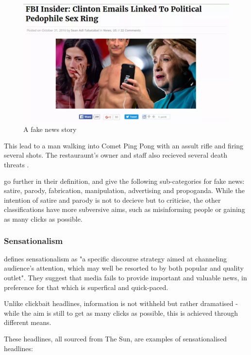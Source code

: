 \begin{figure}[h!]
  \includegraphics[width=\linewidth]{images/fakenews.png}
  \caption{A fake news story}
  \label{fig:fakenews}
\end{figure}


This lead to a man walking into Comet Ping Pong with an assult rifle and firing several shots. The restauraunt's owner and staff also recieved several death threats \cite{lopez2016}. 

\citeauthor{allcott2017} go further in their definition, and give the following sub-categories for fake news: satire, parody, fabrication, manipulation, advertising and propoganda. While the intention of satire and parody is not to decieve but to criticise, the other classifications have more subversive aims, such as misinforming people or gaining as many clicks as possible.

\subsubsection{Sensationalism}
 defines sensationalism as "a specific discourse strategy  aimed  at  channeling  audience's  attention,  which  may  well  be  resorted  to  by  both  popular and quality outlet". They suggest that media fails to provide important and valuable news, in preference for that which is superfical and quick-paced.

Unlike clickbait headlines, information is not withheld but rather dramatised - while the aim is still to get as many clicks as possible, this is achieved through different means.

These headlines, all sourced from The Sun, are examples of sensationalised headlines:

